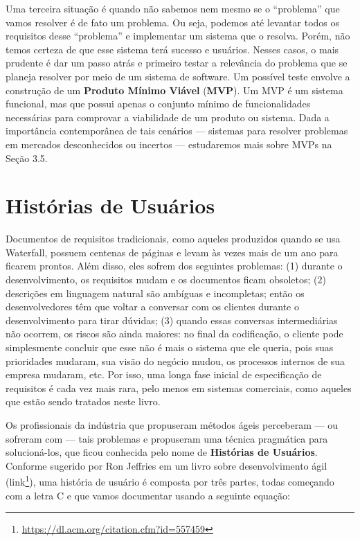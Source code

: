 \documentclass[
  11pt,
  twoside]{book}
\DeclareRobustCommand{\href}[2]{#2\footnote{\url{#1}}}
\begin{document}
Uma terceira situação é quando não sabemos nem mesmo se o ``problema''
que vamos resolver é de fato um problema. Ou seja, podemos até levantar
todos os requisitos desse ``problema'' e implementar um sistema que o
resolva. Porém, não temos certeza de que esse sistema terá sucesso e
usuários. Nesses casos, o mais prudente é dar um passo atrás e primeiro
testar a relevância do problema que se planeja resolver por meio de um
sistema de software. Um possível teste envolve a construção de um
\textbf{Produto Mínimo Viável} (\textbf{MVP}). Um MVP é um sistema
funcional, mas que possui apenas o conjunto mínimo de funcionalidades
necessárias para comprovar a viabilidade de um produto ou sistema. Dada
a importância contemporânea de tais cenários --- sistemas para resolver
problemas em mercados desconhecidos ou incertos --- estudaremos mais
sobre MVPs na Seção 3.5.

\hypertarget{histuxf3rias-de-usuuxe1rios}{%
\section{Histórias de Usuários}\label{histuxf3rias-de-usuuxe1rios}}

 Documentos de requisitos tradicionais,
como aqueles produzidos quando se usa Waterfall, possuem centenas de
páginas e levam às vezes mais de um ano para ficarem prontos. Além
disso, eles sofrem dos seguintes problemas: (1) durante o
desenvolvimento, os requisitos mudam e os documentos ficam obsoletos;
(2) descrições em linguagem natural são ambíguas e incompletas; então os
desenvolvedores têm que voltar a conversar com os clientes durante o
desenvolvimento para tirar dúvidas; (3) quando essas conversas
intermediárias não ocorrem, os riscos são ainda maiores: no final da
codificação, o cliente pode simplesmente concluir que esse não é mais o
sistema que ele queria, pois suas prioridades mudaram, sua visão do
negócio mudou, os processos internos de sua empresa mudaram, etc. Por
isso, uma longa fase inicial de especificação de requisitos é cada vez
mais rara, pelo menos em sistemas comerciais, como aqueles que estão
sendo tratados neste livro.

Os profissionais da indústria que propuseram métodos ágeis perceberam
--- ou sofreram com --- tais problemas e propuseram uma técnica
pragmática para solucioná-los, que ficou conhecida pelo nome de
\textbf{Histórias de Usuários}. Conforme sugerido por Ron Jeffries em um
livro sobre desenvolvimento ágil
(\href{https://dl.acm.org/citation.cfm?id=557459}{link}), uma história
de usuário é composta por três partes, todas começando com a letra C e
que vamos documentar usando a seguinte equação:
\end{document}
